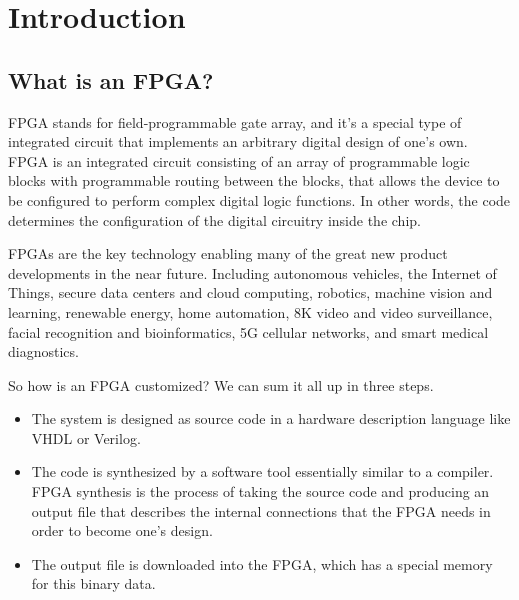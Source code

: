 \section{Introduction}

\subsection{What is an FPGA?}
FPGA stands for field-programmable gate array, and it's a special type of integrated circuit that implements an arbitrary digital design of one's own. FPGA is an integrated circuit consisting of an array of programmable logic blocks with programmable routing between the blocks, that allows the device to be configured to perform complex digital logic functions. In other words, the code determines the configuration of the digital circuitry inside the chip. 

FPGAs are the key technology enabling many of the great new product developments in the near future. Including autonomous vehicles, the Internet of Things, secure data centers and cloud computing, robotics, machine vision and learning, renewable energy, home automation, 8K video and video surveillance, facial recognition and bioinformatics, 5G cellular networks, and smart medical diagnostics.

So how is an FPGA customized? We can sum it all up in three steps. 
\begin{itemize}
	\item The system is designed as source code in a hardware description language like VHDL or Verilog. 
	\item The code is synthesized by a software tool essentially similar to a compiler. FPGA synthesis is the process of taking the source code and producing an output file that describes the internal connections that the FPGA needs in order to become one's design. 
	\item The output file is downloaded into the FPGA, which has a special memory for this binary data.
\end{itemize}

